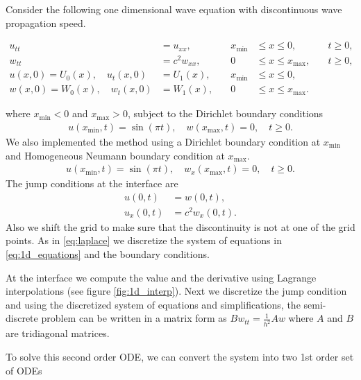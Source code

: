 \documentclass[10pt,a4paper,twoside, french]{article}
\numberwithin{equation}{section}
\numberwithin{figure}{section}
\numberwithin{table}{section}
\begin{document}
Consider the following one dimensional wave equation with discontinuous wave propagation speed. 
\begin{center}
\begin{minipage}[c]{.7\textwidth}
\begin{align}
u_{tt} &= u_{xx}, \quad &x_{\min}&\leq x\leq 0, \quad &t\geq0,\\
w_{tt} &= c^2w_{xx}, \quad &0&\leq x\leq x_{\max}, \quad &t\geq0,\\
u(x,0) = U_0(x), \quad u_t(x,0) &= U_1(x), \quad &x_{\min}&\leq x\leq 0,\\
w(x,0) = W_0(x), \quad w_t(x,0) &= W_1(x), \quad &0&\leq x\leq x_{\max}.
\label{eq:1d_equations}
\end{align}
\end{minipage}
\end{center}

where $x_{\min}<0$ and $x_{\max}>0$, subject to the Dirichlet boundary conditions
\begin{align}
u(x_{\min},t) = \sin(\pi t), \quad w(x_{\max},t) = 0, \quad t\geq 0.
\label{eq:1d_bc_1}
\end{align}
We also implemented the method using a Dirichlet boundary condition at $x_{\min}$ and Homogeneous Neumann boundary condition at $x_{\max}$. 
\begin{align}
u(x_{\min},t) = \sin(\pi t), \quad w_x(x_{\max},t) = 0, \quad t\geq 0.
\label{eq:1d_bc_2}
\end{align}
The jump conditions at the interface are
\begin{align}
u(0,t) &= w(0,t), \nonumber \\
u_x(0,t) &= c^2w_x(0,t).
\label{eq:1d_jump}
\end{align}
Also we shift the grid to make sure that the discontinuity is not at one of the grid points. As in \eqref{eq:laplace} we discretize the system of equations in \eqref{eq:1d_equations} and the  boundary conditions.

At the interface we compute the value and the derivative using Lagrange interpolations (see figure \ref{fig:1d_interp}). Next we discretize the jump condition and using the discretized system of equations and simplifications, the semi- discrete problem can be written in a matrix form as $Bw_{tt}=\frac{1}{h^2}Aw$ where $A$ and $B$ are tridiagonal matrices.

To solve this second order ODE, we can convert the system into two 1st order set of ODEs
\end{document}
